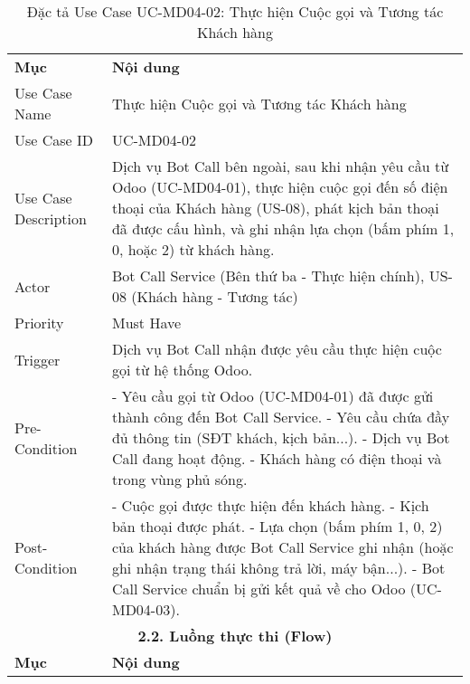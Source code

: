 \begin{longtable}{|m{4cm}|p{11cm}|}
\caption{Đặc tả Use Case UC-MD04-02: Thực hiện Cuộc gọi và Tương tác Khách hàng} \label{tab:uc_md04_02} \\
\hline

\endhead %
\hline
\endfoot %
\hline
\endlastfoot %
\multicolumn{2}{|c|}{\textbf{2.1. Tóm tắt (Summary)}} \\
\hline
\textbf{Mục} & \textbf{Nội dung} \\
\hline
Use Case Name & Thực hiện Cuộc gọi và Tương tác Khách hàng \\
\hline
Use Case ID & UC-MD04-02 \\
\hline
Use Case Description & Dịch vụ Bot Call bên ngoài, sau khi nhận yêu cầu từ Odoo (UC-MD04-01), thực hiện cuộc gọi đến số điện thoại của Khách hàng (US-08), phát kịch bản thoại đã được cấu hình, và ghi nhận lựa chọn (bấm phím 1, 0, hoặc 2) từ khách hàng. \\
\hline
Actor & Bot Call Service (Bên thứ ba - Thực hiện chính), US-08 (Khách hàng - Tương tác) \\
\hline
Priority & Must Have \\
\hline
Trigger & Dịch vụ Bot Call nhận được yêu cầu thực hiện cuộc gọi từ hệ thống Odoo. \\
\hline
Pre-Condition & - Yêu cầu gọi từ Odoo (UC-MD04-01) đã được gửi thành công đến Bot Call Service. \newline - Yêu cầu chứa đầy đủ thông tin (SĐT khách, kịch bản...). \newline - Dịch vụ Bot Call đang hoạt động. \newline - Khách hàng có điện thoại và trong vùng phủ sóng. \\
\hline
Post-Condition & - Cuộc gọi được thực hiện đến khách hàng. \newline - Kịch bản thoại được phát. \newline - Lựa chọn (bấm phím 1, 0, 2) của khách hàng được Bot Call Service ghi nhận (hoặc ghi nhận trạng thái không trả lời, máy bận...). \newline - Bot Call Service chuẩn bị gửi kết quả về cho Odoo (UC-MD04-03). \\
\hline
\multicolumn{2}{|c|}{\textbf{2.2. Luồng thực thi (Flow)}} \\
\hline
\textbf{Mục} & \textbf{Nội dung} \\
\hline

\end{longtable}
